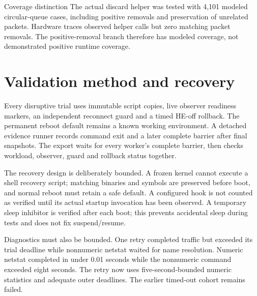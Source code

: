\documentclass[11pt,letterpaper,oneside]{article}
\begin{document}
\begin{finding}{Coverage distinction}
The actual discard helper was tested with 4,101 modeled circular-queue cases, including positive removals and preservation of unrelated packets. Hardware traces observed helper calls but zero matching packet removals. The positive-removal branch therefore has modeled coverage, not demonstrated positive runtime coverage.\end{finding}

\section{Validation method and recovery}
Every disruptive trial uses immutable script copies, live observer readiness markers, an independent reconnect guard and a timed HE-off rollback. The permanent reboot default remains a known working environment. A detached evidence runner records command exit and a later complete barrier after final snapshots. The export waits for every worker's complete barrier, then checks workload, observer, guard and rollback status together.

The recovery design is deliberately bounded. A frozen kernel cannot execute a shell recovery script; matching binaries and symbols are preserved before boot, and normal reboot must retain a safe default. A configured hook is not counted as verified until its actual startup invocation has been observed. A temporary sleep inhibitor is verified after each boot; this prevents accidental sleep during tests and does not fix suspend/resume.

Diagnostics must also be bounded. One retry completed traffic but exceeded its trial deadline while nonnumeric netstat waited for name resolution. Numeric netstat completed in under 0.01 seconds while the nonnumeric command exceeded eight seconds. The retry now uses five-second-bounded numeric statistics and adequate outer deadlines. The earlier timed-out cohort remains failed.
\end{document}
